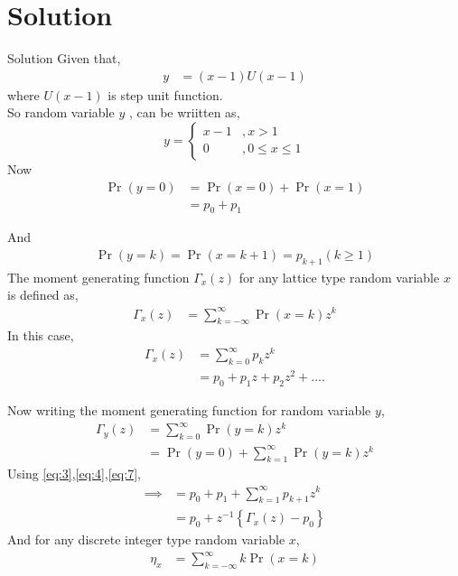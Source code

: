 \documentclass{beamer}
\providecommand{\pr}[1]{\ensuremath{\Pr\left(#1\right)}}
\providecommand{\brak}[1]{\ensuremath{\left(#1\right)}}
\providecommand{\cbrak}[1]{\ensuremath{\left\{#1\right\}}}
\begin{document}
\section{Solution}
\begin{frame}{Solution}
 Given that,
   \begin{align}
       y &= \brak{x-1}U\brak{x-1}
    \end{align}
where $U\brak{x-1}$ is step unit function.\\
     So random variable $y$ , can be wriitten as,
     \begin{equation*}
        y =      \begin{cases}
                        x-1   &, x > 1\\
                        0     &, 0\leq x \leq 1
                   \end{cases}  
      \end{equation*}
Now 
    \begin{align}
          \pr{y=0} &= \pr{x=0} + \pr{x=1}\\
                        &= p_{0} + p_{1}\label{eq:3}
     \end{align}
\end{frame}
\begin{frame}
And 
      \begin{align}
         \pr{y=k} = \pr{x=k+1} = p_{k+1} \brak{k \geq 1}\label{eq:4}
       \end{align}
The moment generating function $\Gamma_{x}\brak{z}$ for any lattice type random variable $x$ is defined as,
      \begin{align}
         \Gamma_{x}\brak{z} &= \sum_{k=-\infty}^{\infty}\pr{x=k}z^{k}
      \end{align}
In this case,
      \begin{align}
         \Gamma_{x}\brak{z} &= \sum_{k=0}^{\infty}p_{k}z^{k}\\
                                        &= p_{0} + p_{1}z + p_{2}z^2 +.... \label{eq:7}
      \end{align}
\end{frame}
\begin{frame}
Now writing the moment generating function for random variable $y$,
     \begin{align}
         \Gamma_{y}\brak{z} &= \sum_{k=0}^{\infty}\pr{y=k}z^{k}\\
                                         &= \pr{y=0} + \sum_{k=1}^{\infty}\pr{y=k}z^k
      \end{align}
 Using \eqref{eq:3},\eqref{eq:4},\eqref{eq:7},
      \begin{align}
              \implies       &= p_{0} + p_{1} + \sum_{k=1}^{\infty}p_{k+1}z^{k}\\              
                                &= p_{0} + z^{-1}\cbrak{\Gamma_{x}\brak{z} - p_{0}}
      \end{align}
And for any discrete integer type random variable $x$,
      \begin{align}
             \eta_{x} &= \sum_{k = -\infty}^{\infty}k\pr{x=k}
     \end{align}
\end{frame}
\end{document}
